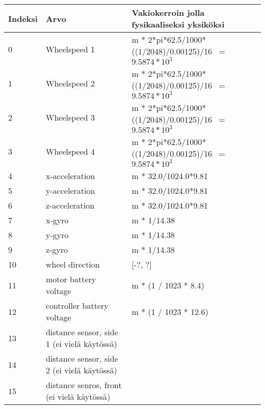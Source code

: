 \begin{longtable}{l | p{5cm} | l }
Indeksi & Arvo & Vakiokerroin jolla fysikaaliseksi yksiköksi \\ \hline
0 & Wheelspeed 1 & m * 2*pi*62.5/1000*((1/2048)/0.00125)/16 ~= $9.5874*10^3$ \\
1 & Wheelspeed 2 & m * 2*pi*62.5/1000*((1/2048)/0.00125)/16 ~= $9.5874*10^3$ \\
2 & Wheelspeed 3 & m * 2*pi*62.5/1000*((1/2048)/0.00125)/16 ~= $9.5874*10^3$ \\
3 & Wheelspeed 4 & m * 2*pi*62.5/1000*((1/2048)/0.00125)/16 ~= $9.5874*10^3$ \\
4 & x-acceleration & m * 32.0/1024.0*9.81 \\
5 & y-acceleration & m * 32.0/1024.0*9.81 \\
6 & z-acceleration & m * 32.0/1024.0*9.81 \\
7 & x-gyro & m * 1/14.38 \\
8 & y-gyro & m * 1/14.38 \\
9 & z-gyro & m * 1/14.38 \\
10 & wheel direction & [-?, ?] \\
11 & motor battery voltage & m * (1 / 1023 * 8.4) \\
12 & controller battery voltage & m * (1 / 1023 * 12.6) \\
13 & distance sensor, side 1 (ei vielä käytössä) & \\
14 & distance sensor, side 2 (ei vielä käytössä) & \\
15 & distance senros, front (ei vielä käytössä) & \\
\end{longtable}
